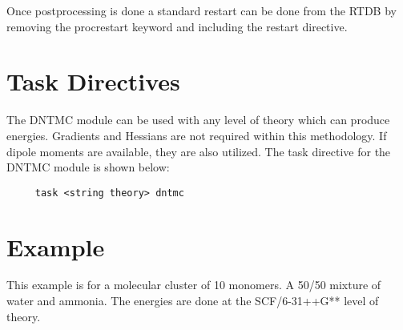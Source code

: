 Once postprocessing is done a standard restart can be done from the
RTDB by removing the procrestart keyword and including the restart
directive.

\section{Task Directives}
The DNTMC module can be used with any level of theory which can
produce energies.  Gradients and Hessians are not required within
this methodology.  If dipole moments are available, they are also
utilized.  The task directive for the DNTMC module is shown below:
\begin{verbatim}
     task <string theory> dntmc
\end{verbatim}

\section{Example}
\label{sec:dntmc_example} This example is for a molecular cluster of
10 monomers.  A 50/50 mixture of water and ammonia.  The energies
are done at the SCF/6-31++G** level of theory.

